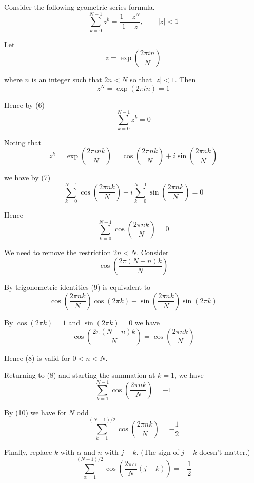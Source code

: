 \documentclass[12pt]{article}
\begin{document}
Consider the following geometric series formula.
\begin{equation*}
\sum_{k=0}^{N-1}z^k=\frac{1-z^N}{1-z},\qquad|z|<1
\tag{6}
\end{equation*}

Let
\begin{equation*}
z=\exp\left(\frac{2\pi in}{N}\right)
\end{equation*}

where $n$ is an integer such that $2n<N$ so that $|z|<1$.
Then
\begin{equation*}
z^N=\exp(2\pi in)=1
\end{equation*}

Hence by (6)
\begin{equation*}
\sum_{k=0}^{N-1}z^k=0
\tag{7}
\end{equation*}

Noting that
\begin{equation*}
z^k=\exp\left(\frac{2\pi ink}{N}\right)=\cos\left(\frac{2\pi nk}{N}\right)+i\sin\left(\frac{2\pi nk}{N}\right)
\end{equation*}

we have by (7)
\begin{equation*}
\sum_{k=0}^{N-1}\cos\left(\frac{2\pi nk}{N}\right)+i\sum_{k=0}^{N-1}\sin\left(\frac{2\pi nk}{N}\right)=0
\end{equation*}

Hence
\begin{equation*}
\sum_{k=0}^{N-1}\cos\left(\frac{2\pi nk}{N}\right)=0
\tag{8}
\end{equation*}

We need to remove the restriction $2n<N$.
Consider
\begin{equation*}
\cos\left(\frac{2\pi(N-n)k}{N}\right)
\tag{9}
\end{equation*}

By trigonometric identities (9) is equivalent to
\begin{equation*}
\cos\left(\frac{2\pi nk}{N}\right)\cos(2\pi k)
+\sin\left(\frac{2\pi nk}{N}\right)\sin(2\pi k)
\end{equation*}

By $\cos(2\pi k)=1$ and $\sin(2\pi k)=0$ we have
\begin{equation*}
\cos\left(\frac{2\pi(N-n)k}{N}\right)=\cos\left(\frac{2\pi nk}{N}\right)
\tag{10}
\end{equation*}

Hence (8) is valid for $0<n<N$.

\bigskip
Returning to (8) and starting the summation at $k=1$, we have
\begin{equation*}
\sum_{k=1}^{N-1}\cos\left(\frac{2\pi nk}{N}\right)=-1
\end{equation*}

By (10) we have for $N$ odd
\begin{equation*}
\sum_{k=1}^{(N-1)/2}\cos\left(\frac{2\pi nk}{N}\right)=-\frac{1}{2}
\end{equation*}

Finally, replace $k$ with $\alpha$ and $n$ with $j-k$.
(The sign of $j-k$ doesn't matter.)
\begin{equation*}
\sum_{\alpha=1}^{(N-1)/2}\cos\left(\frac{2\pi\alpha}{N}(j-k)\right)=-\frac{1}{2}
\end{equation*}
\end{document}
